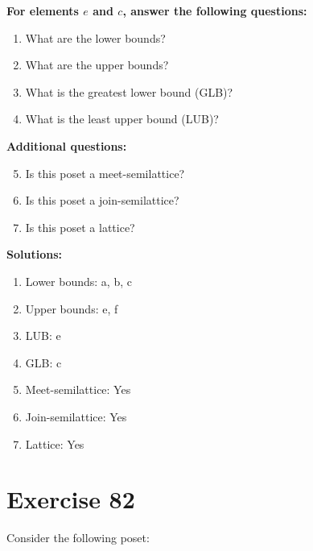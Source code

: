 \documentclass{article}
\begin{document}
    \textbf{For elements $e$ and $c$, answer the following questions:}
\begin{enumerate}
    \item What are the lower bounds?
    \item What are the upper bounds?
    \item What is the greatest lower bound (GLB)?
    \item What is the least upper bound (LUB)?
\end{enumerate}
    \hspace*{3ex} \textbf{Additional questions:}
\begin{enumerate}
    \setcounter{enumi}{4}
    \item Is this poset a meet-semilattice?
    \item Is this poset a join-semilattice?
    \item Is this poset a lattice?
\end{enumerate}

\textbf{Solutions:}
\begin{enumerate}
    \item Lower bounds: {a, b, c}
    \item Upper bounds: {e, f}
    \item LUB: e
    \item GLB: c
    \item Meet-semilattice: Yes
    \item Join-semilattice: Yes
    \item Lattice: Yes
\end{enumerate}
\newpage
\section*{Exercise 82}
Consider the following poset:
\begin{center}
\end{center}
\end{document}
